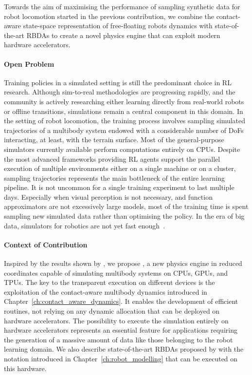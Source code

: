 Towards the aim of maximising the performance of sampling synthetic data for robot locomotion started in the previous contribution, we combine the contact-aware state-space representation of free-floating robots dynamics with state-of-the-art \acp{RBDA} to create a novel physics engine that can exploit modern hardware accelerators.

\paragraph{Open Problem}

Training policies in a simulated setting is still the predominant choice in \ac{RL} research.
Although sim-to-real methodologies are progressing rapidly, and the community is actively researching either learning directly from real-world robots or offline transitions, simulations remain a central component in this domain.
In the setting of robot locomotion, the training process involves sampling simulated trajectories of a multibody system endowed with a considerable number of \acp{DoF} interacting, at least, with the terrain surface.
Most of the general-purpose simulators currently available perform computations entirely on \acp{CPU}.
Despite the most advanced frameworks providing \ac{RL} agents support the parallel execution of multiple environments either on a single machine or on a cluster, sampling trajectories represents the main bottleneck of the entire learning pipeline.
It is not uncommon for a single training experiment to last multiple days.
Especially when visual perception is not necessary, and function approximators are not excessively large models, most of the training time is spent sampling new simulated data rather than optimising the policy.
In the era of big data, simulators for robotics are not yet fast enough~\parencite{choi_use_2021}.

\paragraph{Context of Contribution}

Inspired by the results shown by \textcite{freeman_brax_2021}, we propose \jaxsim, a new physics engine in reduced coordinates capable of simulating multibody systems on \acp{CPU}, \acp{GPU}, and \acp{TPU}.
The key to the transparent execution on different devices is the exploitation of the contact-aware multibody dynamics introduced in Chapter~\ref{ch:contact_aware_dynamics}.
It enables the development of efficient routines, not relying on any dynamic allocation that can be deployed on hardware accelerators.
The possibility to execute the simulation entirely on hardware accelerators represents an essential feature for applications requiring the generation of a massive amount of data like those belonging to the robot learning domain.
We also describe state-of-the-art \acp{RBDA} proposed by \textcite{featherstone_rigid_2008} with the notation introduced in Chapter~\ref{ch:robot_modelling} that can be executed on this hardware.

